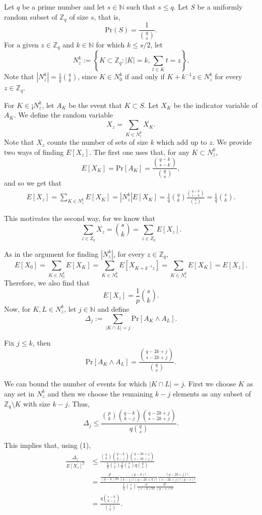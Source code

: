 Let $q$ be a prime number and let $s \in \mathbb{N}$ such that $s\leq q$. Let $S$ be a uniformly random subset of $\mathbb{Z}_q$ of size $s$, that is, 
\[\text{Pr}(S) = \frac{1}{{q \choose s}}.\]
For a given $z \in \mathbb{Z}_q$ and $k \in \mathbb{N}$ for which $k \leq s/2$, let 
\[N_z^k := \left\{K \subset \mathbb{Z}_q: |K| = k, \sum_{t \in K} t = z\right\}.\]
Note that $|N_z^k| = \frac{1}{q}{q \choose k}$, since $K \in N_0^k$ if and only if $K + k^{-1}z \in N_z^k$ for every $z \in \mathbb{Z}_q$.\par
For $K \in¡ N_z^k$, let $A_K$ be the event that $K \subset S$. Let $X_K$ be the indicator variable of $A_K$.
We define the random variable 
\[X_z = \sum_{K \in N_z^k} X_K.\]
Note that $X_z$ counts the number of sets of size $k$ which add up to $z$. We provide two ways of finding $E[X_z]$. The first one uses that, for any $K \subset N^k_z$, 
\[E[X_K] = \text{Pr}[A_K] = \frac{{q - k \choose s - k}}{{q \choose s}},\]
and so we get that
\begin{align*}
    E[X_z] = \sum_{K \in N_z^k} E[X_K] = |N_z^k|E[X_K] = \frac{1}{q}{q \choose k}\frac{{q - k \choose s - k}}{{q \choose s}} = \frac{1}{q} {s \choose k}.
\end{align*}
\par
This motivates the second way, for we know that 
\[\sum_{z \in Z_q} X_z = {s \choose k} = \sum_{z \in Z_q} E[X_z].\]\par
As in the argument for finding $|N_z^k|$, for every $z \in \mathbb{Z}_q$, 
\[E[X_0] = \sum_{K \in N_0^k}E[X_K] = \sum_{K \in N_0^k} E[X_{K + k^{-1}z}] = \sum_{K \in N_z^k} E[X_K] = E[X_z].\]
Therefore, we also find that
\begin{equation}
E[X_z] = \frac{1}{p} {s \choose k}.
\end{equation}
Now, for $K, L \in N_z^k$, let $j \in \mathbb{N}$ and define
\[\Delta_j := \sum_{|K \cap L| = j} \text{Pr}[A_K \land A_L].\]
\par Fix $j \leq k$, then 
\[\text{Pr}[A_K \land A_L] = \frac{{q - 2k + j \choose s - 2k + j}}{{q \choose s}}.\]
\par
We can bound the number of events for which $|K \cap L| = j$. First we choose $K$ as any set in $N_z^k$ and then we choose the remaining $k- j$ elements as any subset of $\mathbb{Z}_q \setminus K$ with size $k - j$. Thus, 
\[\Delta_j \leq \frac{{p \choose k} {q - k \choose k - j}{q - 2k + j \choose s - 2k + j}}{q{q \choose s}}.\]
\par This implies that, using (1),
\begin{align*}
    \frac{\Delta_j}{E[X_z]^2} &\leq \frac{{q \choose k} {q - k \choose k - j}{q - 2k + j \choose s - 2k + j}}{\frac{1}{q} {s \choose k}\frac{1}{q} {s \choose k}q{q \choose s}} \\
    &= \frac{\frac{q!}{(q - k)!k!}\frac{(p - k)!}{(k - j)!(q - 2k + k)!}\frac{(q - 2k + j)!}{(s - 2k + j)!(q - s)!}}{\frac{1}{q}{s \choose k}\frac{s!}{(s - k)!k!}\frac{q!}{(q - s)!s!}} \\
    &= \frac{q{s - k \choose k - j}}{{s \choose k}}.
\end{align*}
